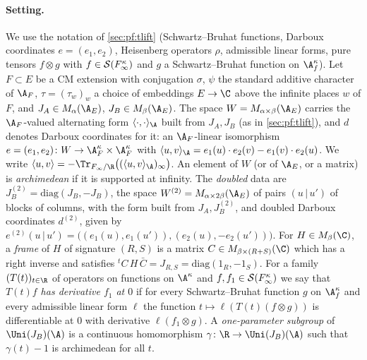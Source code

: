 \paragraph{Setting.}
We use the notation of \cref{sec:pf:tlift} (Schwartz--Bruhat functions, Darboux coordinates $e=(e_1,e_2)$, Heisenberg operators
$\rho$, admissible linear forms, pure tensors $f\otimes g$ with $f\in\mathcal S(F_\infty^\kappa)$ and $g$ a Schwartz--Bruhat function on
$\A_f^\kappa$). Let $F\subset E$ be a CM extension with conjugation $\sigma$, $\psi$ the standard additive character of $\A_F$,
$\tau=(\tau_w)_w$ a choice of embeddings $E\to\C$ above the infinite places $w$ of $F$, and $J_A\in M_\alpha(\A_E)$, $J_B\in M_\beta(\A_E)$.
The space $W=M_{\alpha\times\beta}(\A_E)$ carries the $\A_F$-valued alternating form $\langle\cdot,\cdot\rangle_\A$ built from
$J_A,J_B$ (as in \cref{sec:pf:tlift}), and $d$ denotes Darboux coordinates for it: an $\A_F$-linear isomorphism
$e=(e_1,e_2)\colon W\to\A_F^\kappa\times\A_F^\kappa$ with $\langle u,v\rangle_\A=e_1(u)\cdot e_2(v)-e_1(v)\cdot e_2(u)$. We write
$\langle u,v\rangle=-\Tr_{F_\infty/\R}\bigl((\langle u,v\rangle_\A)_\infty\bigr)$. An element of $W$ (or of $\A_E$, or a
matrix) is \emph{archimedean} if it is supported at infinity. The \emph{doubled} data are $J_B^{(2)}=\mathrm{diag}(J_B,-J_B)$, the space
$W^{(2)}=M_{\alpha\times2\beta}(\A_E)$ of pairs $(u\,|\,u')$ of blocks of columns, with the form built from $J_A,J_B^{(2)}$, and doubled
Darboux coordinates $d^{(2)}$, given by $e^{(2)}(u\,|\,u')=\bigl((e_1(u),e_1(u')),(e_2(u),-e_2(u'))\bigr)$. For $H\in M_\beta(\C)$, a
\emph{frame} of $H$ of signature $(R,S)$ is a matrix $C\in M_{\beta\times(R+S)}(\C)$ which has a right inverse and satisfies
${}^tC\,H\,\bar C=J_{R,S}=\mathrm{diag}(1_R,-1_S)$. For a family $(T(t))_{t\in\R}$ of operators on functions on $\A^\kappa$
and $f,f_1\in\mathcal S(F_\infty^\kappa)$ we say that \emph{$T(t)f$ has derivative $f_1$ at $0$} if for every Schwartz--Bruhat function
$g$ on $\A_f^\kappa$ and every admissible linear form $\ell$ the function $t\mapsto\ell(T(t)(f\otimes g))$ is differentiable at $0$ with
derivative $\ell(f_1\otimes g)$. A \emph{one-parameter subgroup} of $\Uni(J_B)(\A)$ is a continuous homomorphism $\gamma\colon\R\to
\Uni(J_B)(\A)$ such that $\gamma(t)-1$ is archimedean for all $t$.

